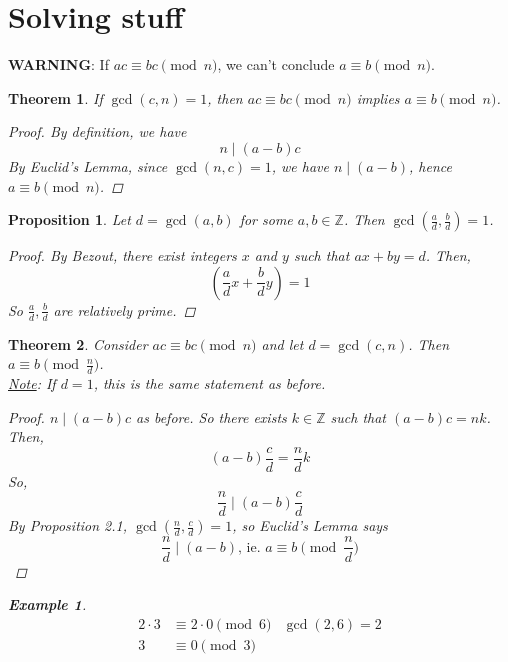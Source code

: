 \documentclass[letterpaper]{article}
\newcommand{\ZZ}{\mathbb{Z}}
\newtheorem{theorem}{Theorem}[section]
\newtheorem{proposition}{Proposition}[section]
\newtheorem{example}{Example}[theorem]
\begin{document}
\section{Solving stuff}
    \textbf{WARNING}: If $ac\equiv bc\pmod{n}$, we can't conclude $a\equiv b \pmod{n}$.
    \begin{theorem}
        If $\gcd(c,n)=1$, then $ac\equiv bc\pmod{n}$ implies $a\equiv b\pmod{n}$.
        \begin{proof}
            By definition, we  have
            \[ 
                n \mid (a-b)c 
            \] 
            By Euclid's Lemma, since $\gcd(n,c)=1$, we have
            $n\mid (a-b)$, hence $a\equiv b\pmod{n}$.
        \end{proof}
    \end{theorem}
    \begin{proposition}
        Let $d=\gcd(a,b)$ for some $a,b\in\ZZ$. 
        Then $\gcd(\frac{a}{d}, \frac{b}{d})=1$. 
        \begin{proof}
            By Bezout, there exist integers $x$ and $y$ such that $ax+by=d$.
            Then, \[ (\frac{a}{d}x+\frac{b}{d}y)=1 \]
            So $\frac{a}{d}, \frac{b}{d}$ are relatively prime.
        \end{proof}
    \end{proposition}
    \begin{theorem}
        Consider $ac\equiv bc \pmod{n}$ and let $d=\gcd(c,n)$. 
        Then $a\equiv b\pmod{\frac{n}{d}}$. \\
        \underline{Note}: If $d=1$, this is the same statement as before.
        \begin{proof}
            $n\mid (a-b)c$ as before. So there exists $k\in\ZZ$ such that
            $(a-b)c=nk$. Then,
            \[
                (a-b)\frac{c}{d} = \frac{n}{d}k 
            \]
            So, 
            \[ 
                \frac{n}{d}\mid (a-b)\frac{c}{d} 
            \]
            By Proposition 2.1, $\gcd(\frac{n}{d}, \frac{c}{d})=1$, so 
            Euclid's Lemma says 
            \[ 
                \frac{n}{d}\mid (a-b) \text{, ie. } a\equiv b\pmod{\frac{n}{d}}
            \]
        \end{proof}
        \begin{example}
            \begin{align*}
                2\cdot 3 &\equiv 2\cdot 0 \pmod{6} & \gcd(2,6)=2 \\
                3 &\equiv 0 \pmod{3}
            \end{align*}
        \end{example}
    \end{theorem}
\end{document}
